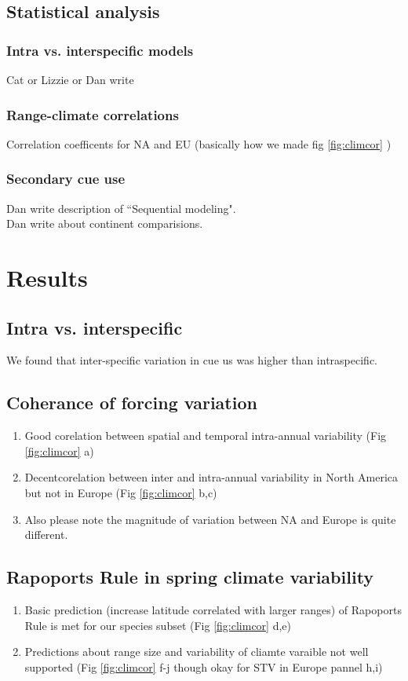 \documentclass[11pt]{article}\usepackage[]{graphicx}\usepackage[]{color}
\begin{document}
\subsection*{Statistical analysis}
\subsubsection*{Intra vs. interspecific models}
Cat or Lizzie or Dan write

\subsubsection*{Range-climate correlations}
Correlation coefficents for NA and EU (basically how we made fig \ref{fig:climcor} )


\subsubsection*{Secondary cue use}
Dan write description of ``Sequential modeling".\\
Dan write about continent comparisions.\\

\section*{Results}
\subsection*{Intra vs. interspecific}
We found that inter-specific variation in cue us was higher than intraspecific.
\subsection*{Coherance of forcing variation}
\begin{enumerate}
\item Good corelation between spatial and temporal intra-annual variability (Fig \ref{fig:climcor} a)
\item Decentcorelation between inter and intra-annual variability in North America but not in Europe  (Fig \ref{fig:climcor} b,c)
\item Also please note the magnitude of variation between NA and Europe is quite different.
\end{enumerate}

\subsection*{Rapoports Rule in spring climate variability}
\begin{enumerate}
\item Basic prediction (increase latitude correlated with larger ranges) of Rapoports Rule is met for our species subset (Fig \ref{fig:climcor} d,e)
\item Predictions about range size and variability of cliamte varaible not well supported
(Fig \ref{fig:climcor} f-j though okay for STV in Europe pannel h,i)
\end{enumerate}
\end{document}
